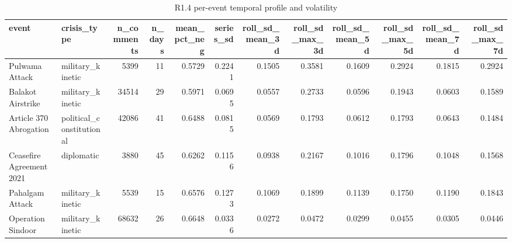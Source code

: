 \begin{table}
\caption{R1.4 per-event temporal profile and volatility}
\label{tab:r1r2_temporal_profiles}
\begin{tabular}{llrrrrrrrrrr}
\toprule
event & crisis\_type & n\_comments & n\_days & mean\_pct\_neg & series\_sd & roll\_sd\_mean\_3d & roll\_sd\_max\_3d & roll\_sd\_mean\_5d & roll\_sd\_max\_5d & roll\_sd\_mean\_7d & roll\_sd\_max\_7d \\
\midrule
Pulwama Attack & military\_kinetic & 5399 & 11 & 0.5729 & 0.2241 & 0.1505 & 0.3581 & 0.1609 & 0.2924 & 0.1815 & 0.2924 \\
Balakot Airstrike & military\_kinetic & 34514 & 29 & 0.5971 & 0.0695 & 0.0557 & 0.2733 & 0.0596 & 0.1943 & 0.0603 & 0.1589 \\
Article 370 Abrogation & political\_constitutional & 42086 & 41 & 0.6488 & 0.0815 & 0.0569 & 0.1793 & 0.0612 & 0.1793 & 0.0643 & 0.1484 \\
Ceasefire Agreement 2021 & diplomatic & 3880 & 45 & 0.6262 & 0.1156 & 0.0938 & 0.2167 & 0.1016 & 0.1796 & 0.1048 & 0.1568 \\
Pahalgam Attack & military\_kinetic & 5539 & 15 & 0.6576 & 0.1273 & 0.1069 & 0.1899 & 0.1139 & 0.1750 & 0.1190 & 0.1843 \\
Operation Sindoor & military\_kinetic & 68632 & 26 & 0.6648 & 0.0336 & 0.0272 & 0.0472 & 0.0299 & 0.0455 & 0.0305 & 0.0446 \\
\bottomrule
\end{tabular}
\end{table}
